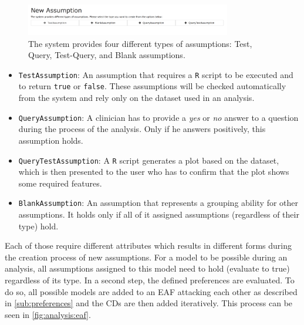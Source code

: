 \begin{figure}[t!]
\centering
\includegraphics[width=0.8\textwidth]{figures/ui_new_assumption}
\caption{The system provides four different types of assumptions: Test, Query, Test-Query, and Blank assumptions.}
\label{fig:ui:assumption}
\end{figure}


\begin{itemize}
	\item \texttt{TestAssumption}: An assumption that requires a \texttt{R} script to be executed and to return \texttt{true} or \texttt{false}. These assumptions will be checked automatically from the system and rely only on the dataset used in an analysis.
	\item \texttt{QueryAssumption}: A clinician has to provide a \textit{yes} or \textit{no} answer to a question during the process of the analysis. Only if he answers positively, this assumption holds.
	\item \texttt{QueryTestAssumption}: A \texttt{R} script generates a plot based on the dataset, which is then presented to the user who has to confirm that the plot shows some required features.
	\item \texttt{BlankAssumption}: An assumption that represents a grouping ability for other assumptions. It holds only if all of it assigned assumptions (regardless of their type) hold. 
\end{itemize}

Each of those require different attributes which results in different forms during the creation process of new assumptions. For a model to be possible during an analysis, all assumptions assigned to this model need to hold (evaluate to true) regardless of its type. In a second step, the defined \glspl{preference} are evaluated. To do so, all possible models are added to an \gls{EAF} attacking each other as described in \autoref{sub:preferences} and the \glspl{CD} are then added iteratively. This process can be seen in \autoref{fig:analysis:eaf}.

